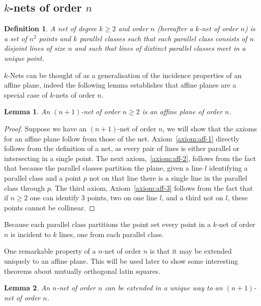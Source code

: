 \documentclass{article}
\newtheorem{lemma}{Lemma}
\newtheorem{definition}{Definition}
\begin{document}
\subsection{\(k\)-nets of order \(n\)}


\begin{definition}\label{def:net}
  A net of degree \(k \geq 2\) and order \(n\) (hereafter a \(k\)-net of order \(n\)) is a set of \(n^2\) points and \(k\) parallel classes such that each parallel class consists of \(n\)
  disjoint lines of size \(n\) and such that lines of distinct parallel classes meet in a unique point.
\end{definition}

\(k\)-Nets can be thought of as a generalisation of the incidence properties of an affine plane, indeed the following lemma establishes that affine planes are a special case of \(k\)-nets of order \(n\).

\begin{lemma}
  An \((n + 1)\)-net of order \(n \geq 2\) is an affine plane of order \(n\).
\end{lemma}

\begin{proof}
  Suppose we have an \((n + 1)\)-net of order \(n\), we will show that the axioms for an affine plane follow from those of the net.
  Axiom~\ref{axiom:aff-1} directly follows from the definition of a net, as every pair of lines is either parallel or intersecting in a single point. The next axiom,~\ref{axiom:aff-2}, follows from the fact that because the parallel classes partition the plane,
  given a line \(l\) identifying a parallel class and a point \(p\) not on that line there is a single line in the parallel class through \(p\). The third axiom, Axiom~\ref{axiom:aff-3} follows from the fact that if \(n \geq 2\) one can identify 3 points, two on one line \(l\), and a third not on \(l\), these points cannot be collinear.
\end{proof}

Because each parallel class partitions the point set every point in a \(k\)-net of order \(n\) is incident to \(k\) lines, one from each parallel class.

One remarkable property of a \(n\)-net of order \(n\) is that it may be extended uniquely to an affine plane. This will be used later to show some interesting theorems about mutually orthogonal latin squares.

\begin{lemma}\label{lemma:net-extension}
  An \(n\)-net of order \(n\) can be extended in a unique way to an \((n + 1)\)-net of order \(n\).
\end{lemma}
\end{document}
